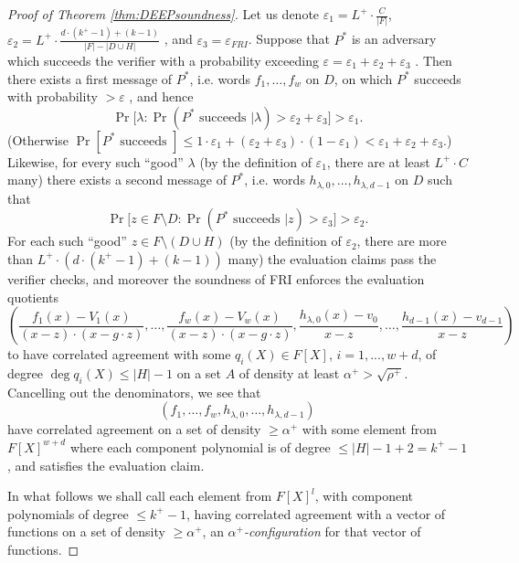 \documentclass[11pt]{article}
\theoremstyle{definition}
\theoremstyle{remark}
\begin{document}
\begin{proof}[Proof of Theorem \ref{thm:DEEPsoundness}]
Let us denote $\varepsilon_1=L^+ \cdot \frac{C}{|F|}$, $\varepsilon_2 = L^+ \cdot  \frac{d\cdot (k^+ - 1) + (k - 1)}{|F| - |D\cup H|}$ , and $\varepsilon_3=\varepsilon_{FRI}$. 
Suppose that $P^*$ is an adversary which succeeds the verifier with a probability exceeding $\varepsilon =\varepsilon_1+\varepsilon_2+\varepsilon_3$ .
Then there exists a first message of $P^*$, i.e. words  $f_1, \ldots, f_w$  on $D$, on which $P^*$ succeeds with probability $> \varepsilon$ , and hence
\[
\Pr\big[\lambda : \Pr\left(P^*\text{ succeeds } |\lambda\right) > \varepsilon_2+\varepsilon_3 \big] > \varepsilon_1.
\]
(Otherwise $\Pr[P^*\text{ succeeds }] \leq 1\cdot \varepsilon_1+ (\varepsilon_2 + \varepsilon_3)\cdot (1-\varepsilon_1) < \varepsilon_1+ \varepsilon_2 + \varepsilon_3$.) 
Likewise, for every such ``good'' $\lambda$ (by the definition of $\varepsilon_1$, there are at least $L^+\cdot C$ many) there exists a second message of $P^*$, i.e. words $h_{\lambda, 0}, \ldots, h_{\lambda, d-1}$ on $D$ such that 
\[
\Pr\big[ z\in F\setminus D :  \Pr(P^*\text{ succeeds }| z) >\varepsilon_3 \big] > \varepsilon_2.
\]
For each such ``good'' $z\in F\setminus (D\cup H)$ (by the definition of $\varepsilon_2$, there are more than $L^+\cdot \left(d\cdot (k^+ - 1) + (k - 1)\right)$ many) the evaluation claims pass the verifier checks, and moreover the soundness of FRI enforces the evaluation quotients
\[ 
\left( 
\frac{f_1(x)-V_1(x)}{(x-z)\cdot (x-g\cdot z)}, \ldots, \frac{f_w(x)-V_w(x)}{(x-z)\cdot (x-g\cdot z)}, \frac{h_{\lambda,0}(x)- v_0}{x-z}, \ldots , \frac{h_{d - 1}(x) -v_{d-1}}{x-z}
\right)
\]
to have correlated agreement with some $q_i(X)\in F[X]$, $i=1,...,w +d$, of degree $\deg q_i(X) \leq |H|-1$ on a set $A$ of density at least 
$
\alpha^+ %
> \sqrt{\rho^+}.
$ 
Cancelling out the denominators, we see that 
\[
(f_1,\ldots, f_w, h_{\lambda,0}, \ldots, h_{\lambda,d-1})
\]
have correlated agreement on a set of density $\geq \alpha^+$ with some  element from $F[X]^{w+d}$
where each component polynomial is of degree $\leq |H| - 1 + 2 = k^+ -1$, and satisfies the evaluation claim.

In what follows we shall call each element from  $F[X]^{l}$, with component polynomials of degree $\leq k^+ - 1$, having correlated agreement with a vector of functions on a set of density $\geq \alpha^+$, an \textit{$\alpha^+$-configuration} for that vector of functions. 


\end{proof}
\end{document}
